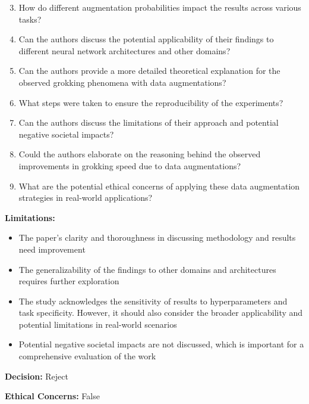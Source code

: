 \begin{tcolorbox}[colback=white!5!white, colframe=black!75!black ]

    \begin{enumerate}
        \setcounter{enumi}{2}
        \item How do different augmentation probabilities impact the results across various tasks?
        \item Can the authors discuss the potential applicability of their findings to different neural network architectures and other domains?
        \item Can the authors provide a more detailed theoretical explanation for the observed grokking phenomena with data augmentations?
        \item What steps were taken to ensure the reproducibility of the experiments?
        \item Can the authors discuss the limitations of their approach and potential negative societal impacts?
        \item Could the authors elaborate on the reasoning behind the observed improvements in grokking speed due to data augmentations?
        \item What are the potential ethical concerns of applying these data augmentation strategies in real-world applications?
    \end{enumerate}


\textbf{Limitations:}
\begin{itemize}
    \item The paper's clarity and thoroughness in discussing methodology and results need improvement
    \item The generalizability of the findings to other domains and architectures requires further exploration
    \item The study acknowledges the sensitivity of results to hyperparameters and task specificity. However, it should also consider the broader applicability and potential limitations in real-world scenarios
    \item Potential negative societal impacts are not discussed, which is important for a comprehensive evaluation of the work
\end{itemize}

\textbf{Decision:} Reject

\textbf{Ethical Concerns:} False
\end{tcolorbox}

